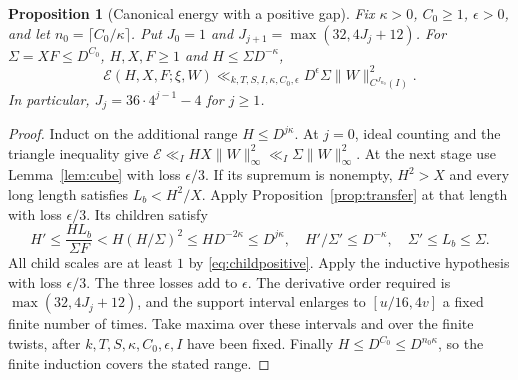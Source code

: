 \documentclass[11pt,a4paper]{article}
\numberwithin{equation}{section}
\newtheorem{proposition}[theorem]{Proposition}
\theoremstyle{definition}
\theoremstyle{remark}
\newcommand{\E}{\mathcal E}
\begin{document}
\begin{proposition}[Canonical energy with a positive gap]\label{prop:canonical}
Fix $\kappa>0$, $C_0\ge1$, $\epsilon>0$, and let $n_0=\lceil C_0/\kappa\rceil$. Put $J_0=1$ and $J_{j+1}=\max(32,4J_j+12)$. For $\Sigma=XF\le D^{C_0}$, $H,X,F\ge1$ and $H\le\Sigma D^{-\kappa}$,
\begin{equation}\label{eq:canonical}
 \E(H,X,F;\xi,W)\ll_{k,T,S,I,\kappa,C_0,\epsilon}
 D^\epsilon\Sigma\|W\|_{C^{J_{n_0}}(I)}^2.
\end{equation}
In particular, $J_j=36\cdot4^{j-1}-4$ for $j\ge1$.
\end{proposition}
\begin{proof}
Induct on the additional range $H\le D^{j\kappa}$. At $j=0$, ideal counting and the triangle inequality give $\E\ll_IHX\|W\|_\infty^2\ll_I\Sigma\|W\|_\infty^2$. At the next stage use Lemma~\ref{lem:cube} with loss $\epsilon/3$. If its supremum is nonempty, $H^2>X$ and every long length satisfies $L_b<H^2/X$. Apply Proposition~\ref{prop:transfer} at that length with loss $\epsilon/3$. Its children satisfy
\[
 H'\le\frac{HL_b}{\Sigma F}<H(H/\Sigma)^2\le HD^{-2\kappa}\le D^{j\kappa},\quad
 H'/\Sigma'\le D^{-\kappa},\quad \Sigma'\le L_b\le\Sigma.
\]
All child scales are at least $1$ by \eqref{eq:childpositive}. Apply the inductive hypothesis with loss $\epsilon/3$. The three losses add to $\epsilon$. The derivative order required is $\max(32,4J_j+12)$, and the support interval enlarges to $[u/16,4v]$ a fixed finite number of times. Take maxima over these intervals and over the finite twists, after $k,T,S,\kappa,C_0,\epsilon,I$ have been fixed. Finally $H\le D^{C_0}\le D^{n_0\kappa}$, so the finite induction covers the stated range.
\end{proof}
\end{document}
